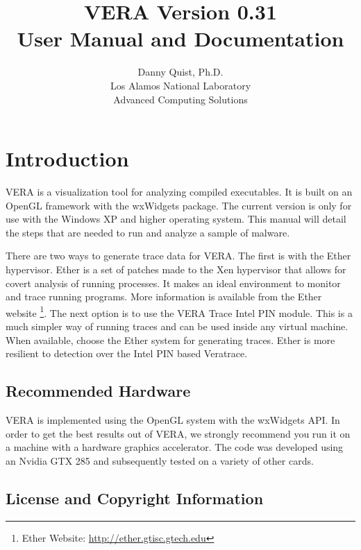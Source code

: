 \documentclass[11pt]{article}
\begin{document}
  \author{
    Danny Quist, Ph.D.\\
	Los Alamos National Laboratory\\
	Advanced Computing Solutions
  }
  \title{VERA Version 0.31\\User Manual and Documentation} 
  \maketitle
  \thispagestyle{empty} %
  \newpage
  \tableofcontents
  \newpage
\setcounter{page}{1}
\fancyhead[R]{\leftmark}

\section{Introduction}
VERA is a visualization tool for analyzing compiled executables. It is
built on an OpenGL framework with the wxWidgets package. The current
version is only for use with the Windows XP and higher operating
system. This manual will detail the steps that are needed to run and
analyze a sample of malware. 

There are two ways to generate trace data for VERA. The first is with
the Ether hypervisor. Ether is a set of patches made to the Xen hypervisor that
allows for covert analysis of running processes. It makes an ideal
environment to monitor and trace running programs. More information is
available from the Ether website
\footnote{Ether Website: \url{http://ether.gtisc.gtech.edu}}. The next
option is to use the VERA Trace Intel PIN module. This is a much
simpler way of running traces and can be used inside any virtual
machine. When available, choose the Ether system for generating
traces. Ether is more resilient to detection over the Intel PIN based
Veratrace.

\subsection{Recommended Hardware}

VERA is implemented using the OpenGL system with the wxWidgets API. In
order to get the best results out of VERA, we strongly recommend you
run it on a machine with a hardware graphics accelerator. The code was
developed using an Nvidia GTX 285 and subsequently tested on a variety
of other cards. 

\subsection{License and Copyright Information}
\end{document}
